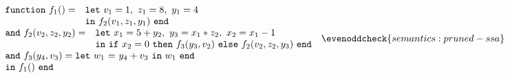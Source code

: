 \begin{equation}
\label{FunctionalConstructionProgram2}
\begin{array}{l}
  \begin{array}{ll}
    \mathtt{function}\ f_1() = 
    & \mathtt{let}\ {v_1} = 1,\
                    {z_1} = 8,\
                    {y_1} = 4\\
    & \mathtt{in}\ {\call {f_2} {v_1,z_1,y_1}}\ \mathtt{end}
  \end{array}\\
  \begin{array}{ll}
    \mathtt{and}\ f_2(v_2,z_2,y_2) =
    & \mathtt{let}\ {x_1} = {5+y_2},\
                    {y_3} = {x_1*z_2},\
                    {x_2} = {x_1-1}\\
    & \mathtt{in}\ {\ite {x_2=0} {\call {f_3} {y_3,v_2}} 
                                 {\call {f_2} {v_2,z_2,y_3}}}\
      \mathtt{end}
  \end{array}\\
  \begin{array}{l}
    \mathtt{and}\ f_3(y_4,v_3) = \letin {w_1} {y_4+v_3} {w_1}\\
    \mathtt{in}\ f_1()\ \mathtt{end}
  \end{array} 
\end{array}
  \evenoddcheck{semantics:pruned-ssa}
\end{equation}
